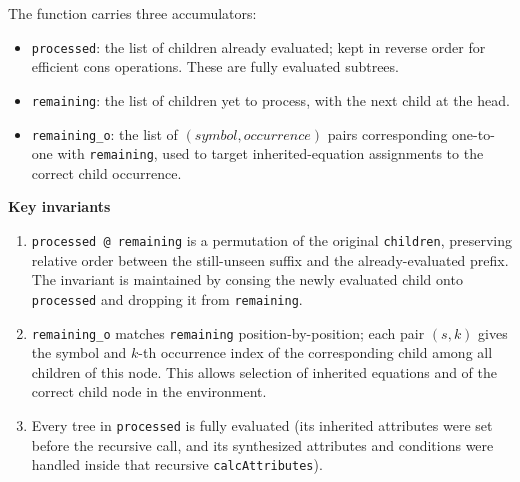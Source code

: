 The function carries three accumulators:
\begin{itemize}
  \item \texttt{processed}: the list of children already evaluated; kept in reverse order for efficient cons operations. These are fully evaluated subtrees. 
  \item \texttt{remaining}: the list of children yet to process, with the next child at the head. 
  \item \texttt{remaining\_o}: the list of $(\textit{symbol}, \textit{occurrence})$ pairs corresponding one-to-one with \texttt{remaining}, used 
  to target inherited-equation assignments to the correct child occurrence. 
\end{itemize}

\textbf{Key invariants}
\begin{enumerate}
  \item \texttt{processed @ remaining} is a permutation of the original \texttt{children}, preserving relative order between the still-unseen suffix and the 
  already-evaluated prefix. The invariant is maintained by consing the newly evaluated child onto \texttt{processed} and dropping it from \texttt{remaining}. 
  \item \texttt{remaining\_o} matches \texttt{remaining} position-by-position; each pair $(s,k)$ gives the symbol and $k$-th occurrence index of the corresponding 
  child among all children of this node. This allows selection of inherited equations and of the correct child node in the environment. 
  \item Every tree in \texttt{processed} is fully evaluated (its inherited attributes were set before the recursive call, and its synthesized attributes 
  and conditions were handled inside that recursive \texttt{calcAttributes}). 
\end{enumerate}

